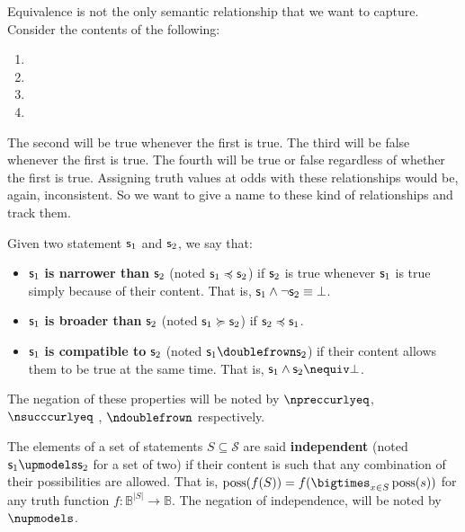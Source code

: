 \documentclass[11pt,letterpaper,fleqn]{memoir} %
\begin{document}
Equivalence is not the only semantic relationship that we want to capture. Consider the contents of the following:
\begin{enumerate}
	\item {}
	\item {}
	\item {}
	\item {}
\end{enumerate}
The second will be true whenever the first is true. The third will be false whenever the first is true. The fourth will be true or false regardless of whether the first is true. Assigning truth values at odds with these relationships would be, again, inconsistent. So we want to give a name to these kind of relationships and track them.

\begin{mathSection}

\begin{defn}
	Given two statement $\mathsf{s}_1$ and $\mathsf{s}_2$, we say that:
	\begin{itemize}
		\item $\mathsf{s}_1$ \textbf{is narrower than} $\mathsf{s}_2$ (noted $\mathsf{s}_1 \preccurlyeq \mathsf{s}_2$) if $\mathsf{s}_2$ is true whenever $\mathsf{s}_1$ is true simply because of their content. That is, $\mathsf{s}_1 \wedge \neg \mathsf{s}_2 \equiv \bot$.
		\item $\mathsf{s}_1$ \textbf{is broader than} $\mathsf{s}_2$ (noted $\mathsf{s}_1 \succcurlyeq \mathsf{s}_2$) if $\mathsf{s}_2 \preccurlyeq \mathsf{s}_1$.
		\item $\mathsf{s}_1$ \textbf{is compatible to} $\mathsf{s}_2$ (noted $\stmt_1 \comp \stmt_2$) if their content allows them to be true at the same time. That is, $\stmt_1 \AND \stmt_2 \nequiv \contradiction$.

	\end{itemize}
	The negation of these properties will be noted by $\nnarrower$, $\nbroader$ , $\ncomp$ respectively.
\end{defn}
\begin{defn}
	The elements of a set of statements $S \subseteq \mathcal{S}$ are said \textbf{independent} (noted $\stmt_1 \indep \stmt_2$ for a set of two) if their content is such that any combination of their possibilities are allowed. That is, $\poss(f(S)) = f(\bigtimes_{x \in S} \poss(s))$ for any truth function $f : \mathbb{B}^{|S|} \to \mathbb{B}$. The negation of independence, will be noted by $\nindep$.
\end{defn}

\end{mathSection}
\end{document}
